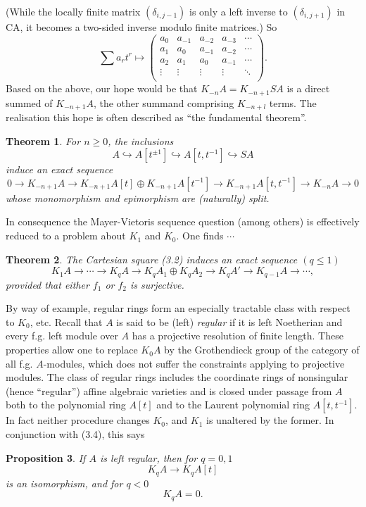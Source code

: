 \documentclass[openany,leqno]{book}  %
\newtheorem{theorem}{Theorem}[chapter]
\newtheorem{prop}[theorem]{Proposition}
\begin{document}
(While the locally finite matrix $(\delta_{i,j-1})$ is only a left inverse to $(\delta_{i,j+1})$ in CA, it becomes a two-sided inverse modulo finite matrices.) So
\[\sum a_r t^r \mapsto \begin{pmatrix}
a_0 & a_{-1} &a_{-2} &a_{-3}& \cdots \\
a_1 & a_{0} &a_{-1} &a_{-2}& \cdots \\
a_2 & a_{1} &a_{0} &a_{-1}& \cdots \\
\vdots & \vdots &\vdots &\vdots &\ddots\\
\end{pmatrix}.\]
Based on the above, our hope would be that $K_{-n}A = K_{-n+1} SA$ is a direct summed of $K_{-n+1} A$, the other summand comprising $K_{-n+l}$ terms. The realisation this hope is often described as ``the fundamental theorem''.

\begin{theorem}
For $n\geqslant0$, the inclusions
\[A \hookrightarrow A[t^{\pm 1}]\hookrightarrow  A[t,t^{-1}]\hookrightarrow SA\]
induce an exact sequence
\[0 \longrightarrow K_{-n+1} A \longrightarrow K_{-n+1}A[t] \oplus K_{-n+1}A[t^{-1}] \longrightarrow K_{-n+1}A[t,t^{-1}]\longrightarrow K_{-n}A \longrightarrow 0\]
whose monomorphism and epimorphism are (naturally) split.
\end{theorem}
In consequence the Mayer-Vietoris sequence question (among others) is effectively reduced to a problem about $K_1$ and $K_0$. One finds $\cdots$
\begin{theorem}
The Cartesian square (3.2) induces an exact sequence $(q\leqslant 1)$
\[K_1A\longrightarrow \cdots \longrightarrow K_q A \longrightarrow K_q A_1\oplus K_qA_2 \longrightarrow K_q A' \longrightarrow K_{q-1}A\longrightarrow \cdots,\]
provided that either $f_1$ or $f_2$ is surjective.
\end{theorem}
By way of example, regular rings form an especially tractable class with respect to $K_0$, etc. Recall that $A$ is said to be (left) {\em regular} if it is left Noetherian and every f.g. left module over $A$ has a projective resolution of finite length. These properties allow one to replace $K_0A$ by the Grothendieck group of the category of all f.g. $A$-modules, which does not suffer the constraints applying to projective modules. The class of regular rings includes the coordinate rings of nonsingular (hence ``regular'') affine algebraic varieties and is closed under passage from $A$ both to the polynomial ring $A[t]$ and to the Laurent polynomial ring $A[t,t^{-1}]$. In fact neither procedure changes $K_0$, and $K_1$ is unaltered by the former. In conjunction with (3.4), this says
\begin{prop}
  If $A$ is left regular, then for $q = 0, 1$
\[K_qA \longrightarrow K_qA[t]\]
 is an isomorphism, and for $q < 0$ 
 $$K_qA = 0 .$$
\end{prop}
\end{document}
